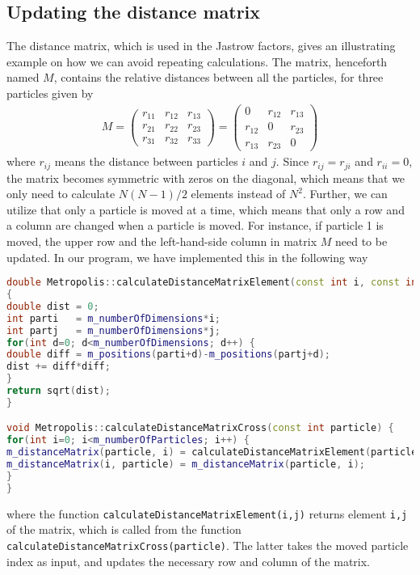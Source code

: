 \subsection{Updating the distance matrix} \label{sec:distancematrix}
The distance matrix, which is used in the Jastrow factors, gives an illustrating example on how we can avoid repeating calculations. The matrix, henceforth named $M$, contains the relative distances between all the particles, for three particles given by
\begin{eqnarray}
M=
\begin{pmatrix}
r_{11} & r_{12} & r_{13} \\
r_{21} & r_{22} & r_{23} \\
r_{31} & r_{32} & r_{33}
\end{pmatrix}
=
\begin{pmatrix}
0 & r_{12} & r_{13} \\
r_{12} & 0 & r_{23} \\
r_{13} & r_{23} & 0
\end{pmatrix}
\end{eqnarray}
where $r_{ij}$ means the distance between particles $i$ and $j$. Since $r_{ij}=r_{ji}$ and $r_{ii}=0$, the matrix becomes symmetric with zeros on the diagonal, which means that we only need to calculate $N(N-1)/2$ elements instead of $N^2$. Further, we can utilize that only a particle is moved at a time, which means that only a row and a column are changed when a particle is moved. For instance, if particle 1 is moved, the upper row and the left-hand-side column in matrix $M$ need to be updated. In our program, we have implemented this in the following way
\lstset{basicstyle=\scriptsize}
\begin{lstlisting}[language=c++]
double Metropolis::calculateDistanceMatrixElement(const int i, const int j) 
{
double dist = 0;
int parti   = m_numberOfDimensions*i;
int partj   = m_numberOfDimensions*j;
for(int d=0; d<m_numberOfDimensions; d++) {
double diff = m_positions(parti+d)-m_positions(partj+d);
dist += diff*diff;
}
return sqrt(dist);
}

void Metropolis::calculateDistanceMatrixCross(const int particle) {
for(int i=0; i<m_numberOfParticles; i++) {
m_distanceMatrix(particle, i) = calculateDistanceMatrixElement(particle, i);
m_distanceMatrix(i, particle) = m_distanceMatrix(particle, i);
}
}
\end{lstlisting}
where the function \lstinline{calculateDistanceMatrixElement(i,j)} returns element \lstinline{i,j} of the matrix, which is called from the function \lstinline{calculateDistanceMatrixCross(particle)}. The latter takes the moved particle index as input, and updates the necessary row and column of the matrix. 

